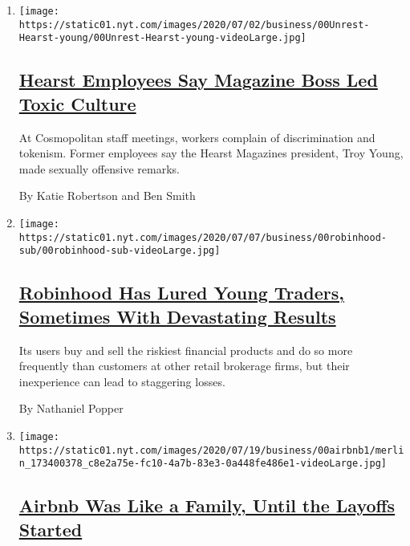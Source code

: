 \begin{enumerate}
\def\labelenumi{\arabic{enumi}.}
\item
  \texttt{[image: https://static01.nyt.com/images/2020/07/02/business/00Unrest-Hearst-young/00Unrest-Hearst-young-videoLarge.jpg]}

  \hypertarget{hearst-employees-say-magazine-boss-led-toxic-culture}{%
  \subsection{\texorpdfstring{\href{/2020/07/22/business/media/hearst-harassment-troy-young.html}{Hearst
  Employees Say Magazine Boss Led Toxic
  Culture}}{Hearst Employees Say Magazine Boss Led Toxic Culture}}\label{hearst-employees-say-magazine-boss-led-toxic-culture}}

  At Cosmopolitan staff meetings, workers complain of discrimination and
  tokenism. Former employees say the Hearst Magazines president, Troy
  Young, made sexually offensive remarks.

  By Katie Robertson and Ben Smith
\item
  \texttt{[image: https://static01.nyt.com/images/2020/07/07/business/00robinhood-sub/00robinhood-sub-videoLarge.jpg]}

  \hypertarget{robinhood-has-lured-young-traders-sometimes-with-devastating-results}{%
  \subsection{\texorpdfstring{\href{/2020/07/08/technology/robinhood-risky-trading.html}{Robinhood
  Has Lured Young Traders, Sometimes With Devastating
  Results}}{Robinhood Has Lured Young Traders, Sometimes With Devastating Results}}\label{robinhood-has-lured-young-traders-sometimes-with-devastating-results}}

  Its users buy and sell the riskiest financial products and do so more
  frequently than customers at other retail brokerage firms, but their
  inexperience can lead to staggering losses.

  By Nathaniel Popper
\item
  \texttt{[image: https://static01.nyt.com/images/2020/07/19/business/00airbnb1/merlin\_173400378\_c8e2a75e-fc10-4a7b-83e3-0a448fe486e1-videoLarge.jpg]}

  \hypertarget{airbnb-was-like-a-family-until-the-layoffs-started}{%
  \subsection{\texorpdfstring{\href{/2020/07/17/technology/airbnb-coronavirus-layoffs-.html}{Airbnb
  Was Like a Family, Until the Layoffs
  Started}}{Airbnb Was Like a Family, Until the Layoffs Started}}\label{airbnb-was-like-a-family-until-the-layoffs-started}}


\end{enumerate}
